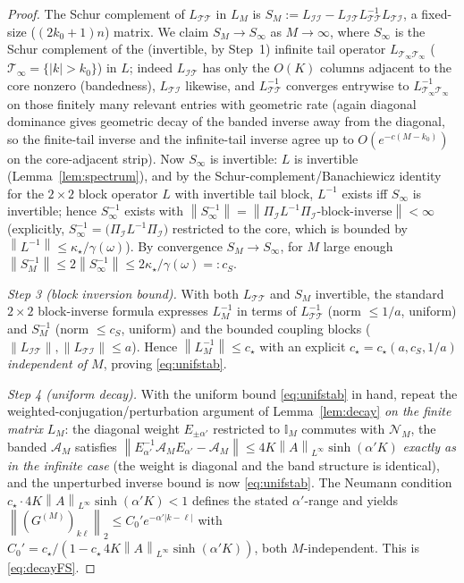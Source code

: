 \documentclass{amsart}
\theoremstyle{definition}
\newcommand{\norm}[1]{\left\lVert#1\right\rVert}
\newcommand{\Acal}{\mathcal{A}}
\newcommand{\Ncal}{\mathcal{N}}
\begin{document}
\begin{proof}
The Schur complement of $L_{\mathcal T\mathcal T}$ in $L_M$ is
$S_M:=L_{\mathcal I\mathcal I}-L_{\mathcal I\mathcal T}L_{\mathcal T\mathcal T}^{-1}
L_{\mathcal T\mathcal I}$, a fixed-size ($(2k_0{+}1)n$) matrix. We claim
$S_M\to S_\infty$ as $M\to\infty$, where $S_\infty$ is the Schur complement of
the (invertible, by Step~1) infinite tail operator $L_{\mathcal T_\infty
\mathcal T_\infty}$ ($\mathcal T_\infty=\{|k|>k_0\}$) in $L$; indeed
$L_{\mathcal I\mathcal T}$ has only the $O(K)$ columns adjacent to the core
nonzero (bandedness), $L_{\mathcal T\mathcal I}$ likewise, and
$L_{\mathcal T\mathcal T}^{-1}$ converges entrywise to
$L_{\mathcal T_\infty\mathcal T_\infty}^{-1}$ on those finitely many relevant
entries with geometric rate (again diagonal dominance gives geometric decay of
the banded inverse away from the diagonal, so the finite-tail inverse and the
infinite-tail inverse agree up to $O(e^{-c(M-k_0)})$ on the core-adjacent strip).
Now $S_\infty$ is invertible: $L$ is invertible (Lemma~\ref{lem:spectrum}), and
by the Schur-complement/Banachiewicz identity for the $2\times2$ block operator
$L$ with invertible tail block, $L^{-1}$ exists iff $S_\infty$ is invertible;
hence $S_\infty^{-1}$ exists with $\norm{S_\infty^{-1}}=\norm{\Pi_{\mathcal I}L^{-1}
\Pi_{\mathcal I}\text{-block-inverse}}<\infty$ (explicitly,
$S_\infty^{-1}=\big(\Pi_{\mathcal I}L^{-1}\Pi_{\mathcal I}\big)$ restricted to
the core, which is bounded by $\norm{L^{-1}}\le\kappa_\star/\gamma(\omega)$).
By convergence $S_M\to S_\infty$, for $M$ large enough
$\norm{S_M^{-1}}\le 2\norm{S_\infty^{-1}}\le 2\kappa_\star/\gamma(\omega)=:c_S$.

\emph{Step 3 (block inversion bound).} With both $L_{\mathcal T\mathcal T}$ and
$S_M$ invertible, the standard $2\times2$ block-inverse formula expresses
$L_M^{-1}$ in terms of $L_{\mathcal T\mathcal T}^{-1}$ (norm $\le 1/a$, uniform)
and $S_M^{-1}$ (norm $\le c_S$, uniform) and the bounded coupling blocks
($\norm{L_{\mathcal I\mathcal T}},\norm{L_{\mathcal T\mathcal I}}\le a$). Hence
$\norm{L_M^{-1}}\le c_\star$ with an explicit
$c_\star=c_\star(a,c_S,1/a)$ \emph{independent of $M$}, proving
\eqref{eq:unifstab}.

\emph{Step 4 (uniform decay).} With the uniform bound \eqref{eq:unifstab} in
hand, repeat the weighted-conjugation/perturbation argument of
Lemma~\ref{lem:decay} \emph{on the finite matrix} $L_M$: the diagonal weight
$E_{\pm\alpha'}$ restricted to $\mathbb I_M$ commutes with $\Ncal_M$, the banded
$\Acal_M$ satisfies $\norm{E_{\alpha'}^{-1}\Acal_M E_{\alpha'}-\Acal_M}\le
4K\norm{A}_{L^\infty}\sinh(\alpha' K)$ \emph{exactly as in the infinite case}
(the weight is diagonal and the band structure is identical), and the
unperturbed inverse bound is now \eqref{eq:unifstab}. The Neumann condition
$c_\star\cdot 4K\norm{A}_{L^\infty}\sinh(\alpha' K)<1$ defines the stated
$\alpha'$-range and yields
$\norm{(G^{(M)})_{k\ell}}_2\le C_0'e^{-\alpha'|k-\ell|}$ with
$C_0'=c_\star/(1-c_\star\,4K\norm{A}_{L^\infty}\sinh(\alpha'K))$, both
$M$-independent. This is \eqref{eq:decayFS}.
\end{proof}
\end{document}
